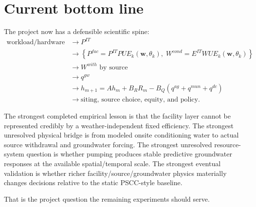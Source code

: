 \documentclass[11pt]{article}
\begin{document}
\section{Current bottom line}

The project now has a defensible scientific spine:
\[
\boxed{\begin{aligned}
\text{workload/hardware}
&\rightarrow P^{IT}\\
&\rightarrow \left\{
P^{fac}=P^{IT}PUE_k(\mathbf w,\theta_k),\;
W^{cond}=E^{IT}WUE_k(\mathbf w,\theta_k)
\right\}\\
&\rightarrow W^{with}\text{ by source}\\
&\rightarrow q^{gw}\\
&\rightarrow h_{m+1}=Ah_m+B_RR_m-B_Q(q^{ag}+q^{mun}+q^{dc})\\
&\rightarrow \text{siting, source choice, equity, and policy}.
\end{aligned}}
\]

The strongest completed empirical lesson is that the facility layer cannot be represented credibly by a weather-independent fixed efficiency. The strongest unresolved physical bridge is from modeled onsite conditioning water to actual source withdrawal and groundwater forcing. The strongest unresolved resource-system question is whether pumping produces stable predictive groundwater responses at the available spatial/temporal scale. The strongest eventual validation is whether richer facility/source/groundwater physics materially changes decisions relative to the static PSCC-style baseline.

That is the project question the remaining experiments should serve.
\end{document}
